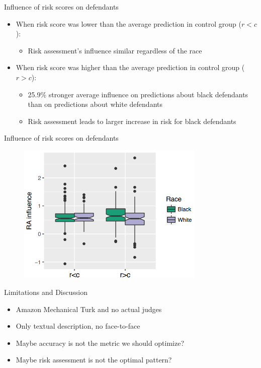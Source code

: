 \documentclass[11pt]{beamer}
\begin{document}
\begin{frame}{Influence of risk scores on defendants}
\begin{itemize}
\item When risk score was lower than the average prediction in control group ($r < c$):
\begin{itemize}
	\item Risk assessment's influence similar regardless of the race
\end{itemize}
\vspace{2pt}
\item When risk score was higher than the average prediction in control group ($r > c$):
\begin{itemize}
	\item 25.9\% stronger average influence on predictions about black defendants than on predictions about white defendants
	\item Risk assessment leads to larger increase in risk for black defendants
\end{itemize}
\end{itemize}
\end{frame}

\begin{frame}{Influence of risk scores on defendants}
\begin{figure}[t!]
	\centering
	\includegraphics[width=0.8\textwidth]{Figures/influence_of_risk_score.png}
\end{figure}
\end{frame}

\begin{frame}{Limitations and Discussion}
\begin{itemize}
	\item Amazon Mechanical Turk and no actual judges
	\item Only textual description, no face-to-face \vspace{2pt}
	
	\item Maybe accuracy is not the metric we should optimize?
	\item Maybe risk assessment is not the optimal pattern? 
\end{itemize}
\end{frame}
\end{document}
